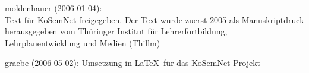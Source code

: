 \documentclass[10pt]{article}
\begin{document}
\begin{attribution}
moldenhauer (2006-01-04):\\ Text für KoSemNet freigegeben. Der Text wurde
zuerst 2005 als Manuskriptdruck herausgegeben vom Thüringer Institut für
Lehrerfortbildung, Lehrplanentwicklung und Medien (Thillm)

graebe (2006-05-02): Umsetzung in \LaTeX\ für das KoSemNet-Projekt
\end{attribution}
\end{document}
